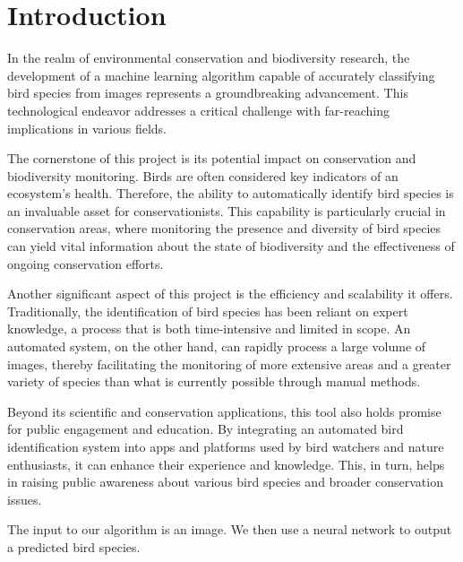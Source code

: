 \section{Introduction}

In the realm of environmental conservation and biodiversity research, the development of a machine learning algorithm capable of accurately classifying bird species from images represents a groundbreaking advancement. This technological endeavor addresses a critical challenge with far-reaching implications in various fields. 

The cornerstone of this project is its potential impact on conservation and biodiversity monitoring. Birds are often considered key indicators of an ecosystem's health. Therefore, the ability to automatically identify bird species is an invaluable asset for conservationists. This capability is particularly crucial in conservation areas, where monitoring the presence and diversity of bird species can yield vital information about the state of biodiversity and the effectiveness of ongoing conservation efforts.

Another significant aspect of this project is the efficiency and scalability it offers. Traditionally, the identification of bird species has been reliant on expert knowledge, a process that is both time-intensive and limited in scope. An automated system, on the other hand, can rapidly process a large volume of images, thereby facilitating the monitoring of more extensive areas and a greater variety of species than what is currently possible through manual methods.

Beyond its scientific and conservation applications, this tool also holds promise for public engagement and education. By integrating an automated bird identification system into apps and platforms used by bird watchers and nature enthusiasts, it can enhance their experience and knowledge. This, in turn, helps in raising public awareness about various bird species and broader conservation issues.

The input to our algorithm is an image. We then use a neural network to output a predicted bird species.